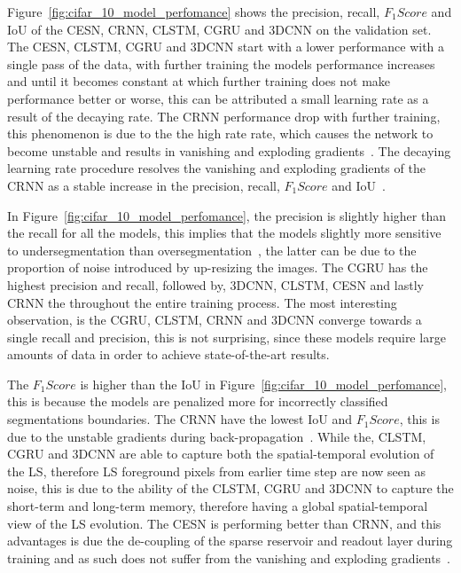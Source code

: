 \documentclass{WitsPhysicsReport}
\begin{document}
Figure~\ref{fig:cifar_10_model_perfomance} shows the precision, recall, $F_{1}Score$ and IoU of the CESN, CRNN, CLSTM, CGRU and 3DCNN on the validation set. The CESN, CLSTM, CGRU and 3DCNN start with a lower performance with a single pass of the data, with further training the models performance increases and until it becomes constant at which further training does not make performance better or worse, this can be attributed a small learning rate as a result of the decaying rate. The CRNN performance drop with further training, this phenomenon is due to the the high rate rate, which causes the network to become unstable and results in vanishing and exploding gradients~\cite{pascanu2013difficulty}. The decaying learning rate procedure resolves the vanishing and exploding gradients of the CRNN as a stable increase in the precision, recall, $F_{1}Score$ and IoU~\cite{you2019does}.

In Figure~\ref{fig:cifar_10_model_perfomance}, the precision is slightly higher than the recall for all the models, this implies that the models slightly more sensitive to undersegmentation than oversegmentation~\cite{sigut2015over, troya2015unsupervised}, the latter can be due to the proportion of noise introduced by up-resizing the images. The CGRU has the highest precision and recall, followed by, 3DCNN, CLSTM, CESN and lastly CRNN the  throughout the entire training process. The most interesting observation, is the CGRU, CLSTM, CRNN and 3DCNN converge towards a single recall and precision, this is not surprising, since these models require large amounts of data in order to achieve state-of-the-art results.

The $F_{1}Score$ is higher than the IoU in Figure~\ref{fig:cifar_10_model_perfomance}, this is because the models are penalized more for incorrectly classified segmentations boundaries. The CRNN have the lowest IoU and $F_{1}Score$, this is due to the unstable gradients during back-propagation~\cite{pascanu2013difficulty}. While the, CLSTM, CGRU and 3DCNN are able to capture both the spatial-temporal evolution of the LS, therefore LS foreground pixels from earlier time step are now seen as noise, this is due to the ability of the CLSTM, CGRU and 3DCNN to capture the short-term and long-term memory, therefore having a global spatial-temporal view of the LS evolution. The CESN is performing better than CRNN, and this advantages is due the de-coupling of the sparse reservoir and readout layer during training and as such does not suffer from the vanishing and exploding gradients~\cite{jaeger2001echo,jaeger2002tutorial,lukovsevivcius2009reservoir}.
\end{document}

